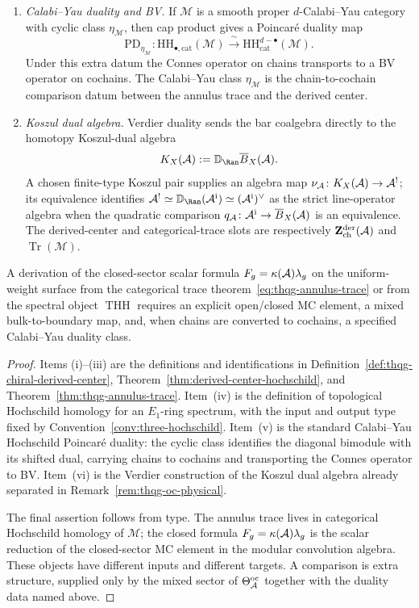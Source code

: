 \begin{theorem}
\begin{enumerate}[label=\textup{(\roman*)}]
\item \emph{Calabi--Yau duality and BV.}
 If $\mathcal{M}$ is a smooth proper $d$-Calabi--Yau category with
 cyclic class $\eta_{\mathcal M}$, then cap product gives a
 Poincar\'e duality map
 \[
 \mathrm{PD}_{\eta_{\mathcal M}}\colon
 \mathrm{HH}_{\bullet,\mathrm{cat}}(\mathcal M)
 \xrightarrow{\;\sim\;}
 \mathrm{HH}^{d-\bullet}_{\mathrm{cat}}(\mathcal M).
 \]
 Under this extra datum the Connes operator on chains transports
 to a BV operator on cochains. The Calabi--Yau class
 $\eta_{\mathcal M}$ is the chain-to-cochain comparison datum between
 the annulus trace and the derived center.

\item \emph{Koszul dual algebra.}
Verdier duality sends the bar coalgebra directly to the homotopy
Koszul-dual algebra
\[
K_X(\cA):=\mathbb{D}_{\Ran}\barB_X(\cA).
\]
A chosen finite-type Koszul pair supplies an algebra map
$\nu_{\mathcal{A}}\colon K_X(\mathcal{A})\to\mathcal{A}^!$; its equivalence identifies
$\cA^!\simeq\mathbb D_{\Ran}(\cA^{\mathrm i})
\simeq(\cA^{\mathrm i})^\vee$ as the strict line-operator algebra
when the quadratic comparison
$q_{\mathcal{A}}\colon\mathcal{A}^{\mathrm i}\to\overline{B}_X(\mathcal{A})$ is an equivalence.
The derived-center and categorical-trace
slots are respectively
$\mathbf{Z}^{\mathrm{der}}_{\mathrm{ch}}(\mathcal{A})$ and
$\operatorname{Tr}(\mathcal M)$.
\end{enumerate}
A derivation of the closed-sector scalar formula
$F_g=\kappa(\mathcal{A})\lambda_g$ on the uniform-weight surface from the
categorical trace theorem~\eqref{eq:thqg-annulus-trace} or from the
spectral object $\operatorname{THH}$ requires an explicit
open/closed MC element, a mixed bulk-to-boundary map, and, when
chains are converted to cochains, a specified Calabi--Yau duality
class.
\end{theorem}

\begin{proof}
Items (i)--(iii) are the definitions and identifications in
Definition~\ref{def:thqg-chiral-derived-center},
Theorem~\ref{thm:derived-center-hochschild}, and
Theorem~\ref{thm:thqg-annulus-trace}. Item~(iv) is the definition
of topological Hochschild homology for an $E_1$-ring spectrum, with
the input and output type fixed by
Convention~\ref{conv:three-hochschild}. Item~(v) is the standard
Calabi--Yau Hochschild Poincar\'e duality: the cyclic class
identifies the diagonal bimodule with its shifted dual, carrying
chains to cochains and transporting the Connes operator to BV.
Item~(vi) is the Verdier construction of the Koszul dual algebra
already separated in Remark~\ref{rem:thqg-oc-physical}.

The final assertion follows from type. The annulus trace lives in
categorical Hochschild homology of $\mathcal M$; the closed formula
$F_g=\kappa(\mathcal{A})\lambda_g$ is the scalar reduction of the
closed-sector MC element in the modular convolution algebra. These
objects have different inputs and different targets. A comparison is
extra structure, supplied only by the mixed sector of
$\Theta^{\mathrm{oc}}_{\mathcal{A}}$ together with the duality data named
above.
\end{proof}

